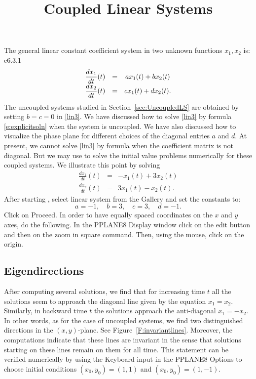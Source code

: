 \documentclass{ximera}
\title{Coupled Linear Systems}
\begin{document}
\begin{abstract}
\end{abstract}
\maketitle

  \label{s:3.5}


The general linear constant coefficient system in two unknown functions 
$x_1,x_2$ is:
\renewcommand{\arraystretch}{1.8}c6.3.1
\begin{equation}\label{lin3}
\begin{array}{ccc}
\displaystyle \frac{dx_1}{dt}(t) & = & ax_1(t) + bx_2(t) \\
\displaystyle \frac{dx_2}{dt}(t) & = & cx_1(t) + dx_2(t).
\end{array}
\end{equation}
\renewcommand{\arraystretch}{1.0}%
The uncoupled systems studied in Section~\ref{sec:UncoupledLS} are obtained 
by setting $b=c=0$ in \eqref{lin3}.  We have discussed how to solve \eqref{lin3} 
by formula \eqref{e:explicitsoln} when the system is uncoupled.  We have also 
discussed how to visualize the phase plane for different choices of the 
diagonal entries $a$ and $d$.  At present, we cannot
solve \eqref{lin3} by formula when the coefficient matrix is not diagonal.
But we may use {\pplane} to solve the initial value problems numerically 
for these coupled systems.  We illustrate this point by solving
\begin{eqnarray*}
\frac{dx_1}{dt}(t) & = &  -x_1(t) + 3x_2(t) \\
\frac{dx_2}{dt}(t) & = &  3x_1(t) - x_2(t).
\end{eqnarray*}
After starting {\pplane}, select {\sf linear system} from the
{\sf Gallery} and set the constants to:
\[
	a = -1,\quad b = 3,\quad c = 3, \quad d = -1.
\]
Click on {\sf Proceed}.  In order to have equally spaced coordinates on
the $x$ and $y$ axes, do the following.   In the {\sf PPLANE8 Display} 
window click on the {\sf edit} button and then on the {\sf zoom in square} 
command.  Then, using the mouse, click on the origin.

\subsection*{Eigendirections}

After computing several solutions, we find that for increasing
time $t$ all the solutions seem to approach the diagonal line
given by the equation $x_1=x_2$. Similarly, in backward time $t$
the solutions approach the anti-diagonal $x_1=-x_2$.  In other
words, as for the case of uncoupled systems, we find two
distinguished directions in the $(x,y)$-plane.  See
Figure~\ref{F:invariantlines}.  Moreover, the computations
indicate that these lines are invariant in the sense that
solutions starting on these lines remain on them for all time.
This statement can be verified numerically by using the {\sf
Keyboard input} in the {\sf PPLANE8 Options} to choose initial
conditions $(x_0,y_0)=(1,1)$ and $(x_0,y_0)=(1,-1)$.
\end{document}

